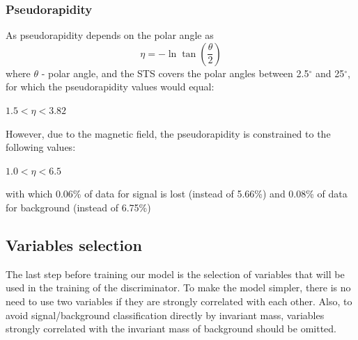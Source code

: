 \subsubsection{Pseudorapidity}
As pseudorapidity depends on the polar angle as 
\begin{equation}
    \eta = -\ln{\tan(\frac{\theta}{2})}
\end{equation}
where $\theta$ - polar angle, and the STS covers the polar angles between 2.5$^{\circ}$ and 25$^{\circ}$, for which the pseudorapidity values would equal:
\begin{center}
    $ 1.5< \eta < 3.82 $
\end{center}
However, due to the magnetic field, the pseudorapidity is constrained to the following values:
\begin{center}
    $ 1.0< \eta < 6.5 $
\end{center}
with which 0.06\% of data for signal is lost (instead of 5.66\%) and 0.08\% of data for background (instead of 6.75\%)

\subsection{Variables selection}
The last step before training our model is the selection of variables that will be used in the training of the discriminator. To make the model simpler, there is no need to use two variables if they are strongly correlated with each other. Also, to avoid signal/background classification directly by invariant mass, variables strongly correlated with the invariant mass of background should be omitted.
